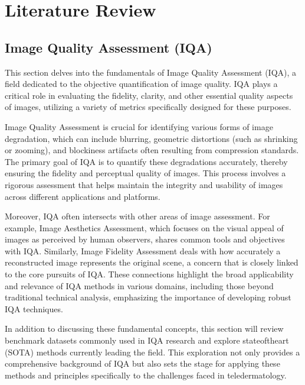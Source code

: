 \chapter{Literature Review}
\label{ch:LiteratureReview}

\section{Image Quality Assessment (IQA)}
\label{sec:OverviewTeledermatology}
This section delves into the fundamentals of Image Quality Assessment (IQA), a field dedicated to the objective quantification of image quality. IQA plays a critical role in evaluating the fidelity, clarity, and other essential quality aspects of images, utilizing a variety of metrics specifically designed for these purposes. \par
\vspace{\baselineskip}
Image Quality Assessment is crucial for identifying various forms of image degradation, which can include blurring, geometric distortions (such as shrinking or zooming), and blockiness artifacts often resulting from compression standards. The primary goal of IQA is to quantify these degradations accurately, thereby ensuring the fidelity and perceptual quality of images. This process involves a rigorous assessment that helps maintain the integrity and usability of images across different applications and platforms.\par
\vspace{\baselineskip}
Moreover, IQA often intersects with other areas of image assessment. For example, Image Aesthetics Assessment, which focuses on the visual appeal of images as perceived by human observers, shares common tools and objectives with IQA. Similarly, Image Fidelity Assessment deals with how accurately a reconstructed image represents the original scene, a concern that is closely linked to the core pursuits of IQA. These connections highlight the broad applicability and relevance of IQA methods in various domains, including those beyond traditional technical analysis, emphasizing the importance of developing robust IQA techniques.\par
\vspace{\baselineskip}
In addition to discussing these fundamental concepts, this section will review benchmark datasets commonly used in IQA research and explore state\-of\-the\-art (SOTA) methods currently leading the field. This exploration not only provides a comprehensive background of IQA but also sets the stage for applying these methods and principles specifically to the challenges faced in teledermatology. \par


